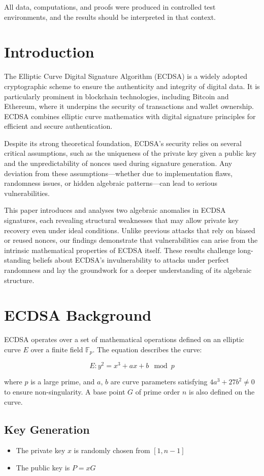 \documentclass[11pt]{article}
\begin{document}
All data, computations, and proofs were produced in controlled test environments, and the results should be interpreted in that context.

\section{Introduction}
The Elliptic Curve Digital Signature Algorithm (ECDSA) is a widely adopted cryptographic scheme to ensure the authenticity and integrity of digital data. It is particularly prominent in blockchain technologies, including Bitcoin and Ethereum, where it underpins the security of transactions and wallet ownership. ECDSA combines elliptic curve mathematics with digital signature principles for efficient and secure authentication.

Despite its strong theoretical foundation, ECDSA's security relies on several critical assumptions, such as the uniqueness of the private key given a public key and the unpredictability of nonces used during signature generation. Any deviation from these assumptions—whether due to implementation flaws, randomness issues, or hidden algebraic patterns—can lead to serious vulnerabilities.

This paper introduces and analyses two algebraic anomalies in ECDSA signatures, each revealing structural weaknesses that may allow private key recovery even under ideal conditions. Unlike previous attacks that rely on biased or reused nonces, our findings demonstrate that vulnerabilities can arise from the intrinsic mathematical properties of ECDSA itself. These results challenge long-standing beliefs about ECDSA's invulnerability to attacks under perfect randomness and lay the groundwork for a deeper understanding of its algebraic structure.

\section{ECDSA Background}
ECDSA operates over a set of mathematical operations defined on an elliptic curve \( E \) over a finite field \( \mathbb{F}_p \). The equation describes the curve:

\[
E: y^2 = x^3 + ax + b \mod p
\]

where \( p \) is a large prime, and \( a \), \( b \) are curve parameters satisfying \( 4a^3 + 27b^2 \neq 0 \) to ensure non-singularity. A base point \( G \) of prime order \( n \) is also defined on the curve.

\subsection*{Key Generation}
\begin{itemize}
  \item The private key \( x \) is randomly chosen from \( [1, n-1] \)
  \item The public key is \( P = xG \)
\end{itemize}
\end{document}
